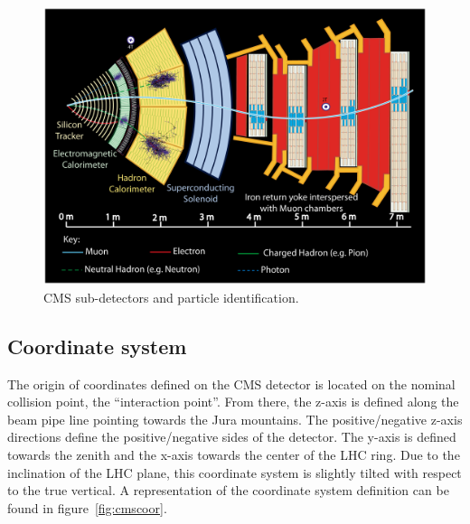 \begin{figure}[!Hhtbp]
  \begin{center}
    \includegraphics[width=\textwidth]{figs/PictureforPoint5_oct04_allp.jpg}
    \caption{CMS sub-detectors and particle identification. }
    \label{fig:cmsslice}
  \end{center}
\end{figure}

\subsection{Coordinate system}
\label{sec:Csys}

The origin of coordinates defined on the CMS detector is located on the nominal collision point, the ``interaction point''. From there, the z-axis is defined along the beam pipe line pointing towards the Jura mountains. The positive/negative z-axis directions define the positive/negative sides of the detector. The y-axis is defined towards the zenith and the x-axis towards the center of the LHC ring. Due to the inclination of the LHC plane, this coordinate system is slightly tilted with respect to the true vertical. A representation of the coordinate system definition can be found in figure~\ref{fig:cmscoor}. 

